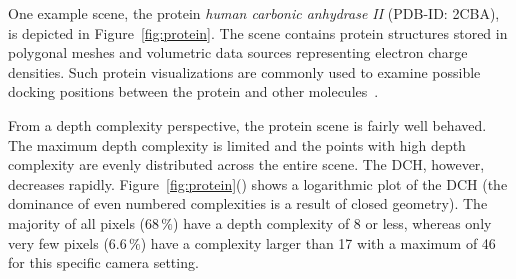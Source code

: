 \documentclass{egpubl}
\newcommand{\dch}{DCH}
\begin{document}
%
One example scene, the protein \emph{human carbonic anhydrase II} (PDB-ID: 2CBA), is depicted in Figure~\ref{fig:protein}. 
The scene contains protein structures stored in polygonal meshes and volumetric data sources representing electron charge densities. 
Such protein visualizations are commonly used to examine possible docking positions between the protein and other molecules~\cite{Seeliger2010}. 

From a depth complexity perspective, the protein scene is fairly well behaved.
The maximum depth complexity is limited and the points with high depth complexity are evenly distributed across the entire scene. 
The \dch{}, however, decreases rapidly.
Figure~\ref{fig:protein}() shows a logarithmic plot of the \dch{} (the dominance of even numbered complexities is a result of closed geometry).
The majority of all pixels ($68\,\%$) have a depth complexity of 8 or less, whereas only very few pixels ($6.6\,\%$) have a complexity larger than 17 with a maximum of 46 for this specific camera setting. 
\end{document}
